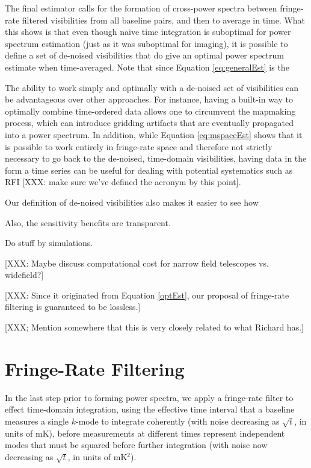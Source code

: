 \documentclass[twocolumn,apj,numberedappendix]{emulateapj}
\begin{document}
The final estimator calls for the formation of cross-power spectra between fringe-rate filtered visibilities from all baseline pairs, and then to average in time.  What this shows is that even though naive time integration is suboptimal for power spectrum estimation (just as it was suboptimal for imaging), it is possible to define a set of de-noised visibilities that do give an optimal power spectrum estimate when time-averaged.  Note that since Equation \eqref{eq:generalEst} is the 

The ability to work simply and optimally with a de-noised set of visibilities can be advantageous over other approaches.  For instance, having a built-in way to optimally combine time-ordered data allows one to circumvent the mapmaking process, which can introduce gridding artifacts that are eventually propagated into a power spectrum.  In addition, while Equation \eqref{eq:mspaceEst} shows that it is possible to work entirely in fringe-rate space and therefore not strictly necessary to go back to the de-noised, time-domain visibilities, having data in the form a time series can be useful for dealing with potential systematics such as RFI [XXX: make sure we've defined the acronym by this point].

Our definition of de-noised visibilities also makes it easier to see how 

Also, the sensitivity benefits are transparent.

Do stuff by simulations.


[XXX: Maybe discuss computational cost for narrow field telescopes vs. widefield?]

[XXX: Since it originated from Equation \eqref{optEst}, our proposal of fringe-rate filtering is guaranteed to be lossless.]

[XXX; Mention somewhere that this is very closely related to what Richard has.]

\section{Fringe-Rate Filtering}
\label{sec:fringe_rate_filtering}

In the last step prior to forming power spectra,
we apply a fringe-rate filter to effect time-domain integration,
using the effective time interval that a baseline measures a single $k$-mode to integrate coherently
(with noise decreasing
as $\sqrt{t}$, in units of mK), before measurements at different times represent independent modes
that must be squared before further integration (with noise now decreasing as $\sqrt{t}$, in units of mK$^2$).
\end{document}

